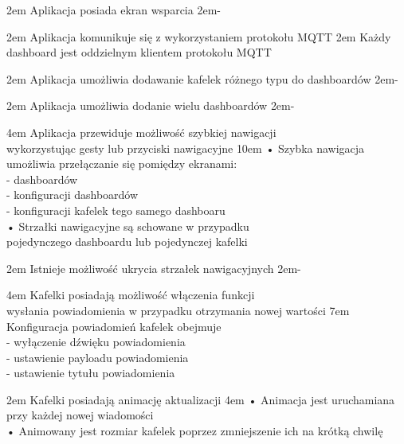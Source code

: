 {2em}{
    Aplikacja posiada ekran wsparcia
}
{2em}{-}

{2em}{
    Aplikacja komunikuje się z wykorzystaniem protokołu MQTT
}
{2em}{
    Każdy dashboard jest oddzielnym klientem protokołu MQTT
}

{2em}{
    Aplikacja umożliwia dodawanie kafelek różnego typu do dashboardów
}
{2em}{-}

{2em}{
    Aplikacja umożliwia dodanie wielu dashboardów
}
{2em}{-}

{4em}{
    Aplikacja przewiduje możliwość szybkiej nawigacji\\
    wykorzystując gesty lub przyciski nawigacyjne
}
{10em}{
    • Szybka nawigacja umożliwia przełączanie się pomiędzy ekranami:\\
    - dashboardów\\
    - konfiguracji dashboardów\\
    - konfiguracji kafelek tego samego dashboaru\\

    • Strzałki nawigacyjne są schowane w przypadku\\
    \hspace*{0.5em} pojedynczego dashboardu lub pojedynczej kafelki
}

{2em}{
    Istnieje możliwość ukrycia strzałek nawigacyjnych
}
{2em}{-}

{4em}{
    Kafelki posiadają możliwość włączenia funkcji\\
    wysłania powiadomienia w przypadku otrzymania nowej wartości
}
{7em}{
    Konfiguracja powiadomień kafelek obejmuje\\
    - wyłączenie dźwięku powiadomienia\\
    - ustawienie payloadu powiadomienia\\
    - ustawienie tytułu powiadomienia
}

{2em}{
    Kafelki posiadają animację aktualizacji
}
{4em}{
    • Animacja jest uruchamiana przy każdej nowej wiadomości\\
    • Animowany jest rozmiar kafelek poprzez zmniejszenie ich na krótką chwilę
}

